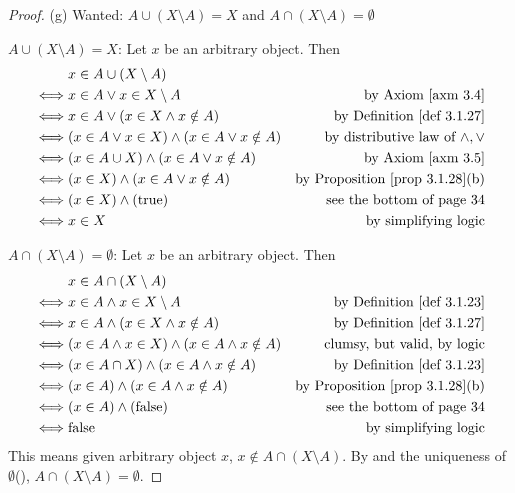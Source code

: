\begin{proof}{(g)} Wanted: \(A \cup (X \setminus A) = X\) and \(A \cap (X \setminus A) = \emptyset\)

\(A \cup (X \setminus A) = X\): Let \(x\) be an arbitrary object. Then
\begin{align*}
         & x \in A \cup (X \setminus A) \\
    \iff & x \in A \lor x \in X \setminus A & \text{by \AXM{3.4}} \\
    \iff & x \in A \lor (x \in X \land x \notin A) & \text{by \DEF{3.1.27}} \\
    \iff & (x \in A \lor x \in X) \land (x \in A \lor x \notin A) & \text{by distributive law of \(\land, \lor\)} \\
    \iff & (x \in A \cup X) \land (x \in A \lor x \notin A) & \text{by \AXM{3.5}} \\
    \iff & (x \in X) \land (x \in A \lor x \notin A) & \text{by \PROP{3.1.28}(b)} \\
    \iff & (x \in X) \land (\text{true}) & \text{see the bottom of page 34} \\
    \iff & x \in X & \text{by simplifying logic}
\end{align*}

\(A \cap (X \setminus A) = \emptyset\): Let \(x\) be an arbitrary object. Then
\begin{align*}
         & x \in A \cap (X \setminus A) \\
    \iff & x \in A \land x \in X \setminus A & \text{by \DEF{3.1.23}} \\
    \iff & x \in A \land (x \in X \land x \notin A) & \text{by \DEF{3.1.27}} \\
    \iff & (x \in A \land x \in X) \land (x \in A \land x \notin A) & \text{clumsy, but valid, by logic} \\
    \iff & (x \in A \cap X) \land (x \in A \land x \notin A) & \text{by \DEF{3.1.23}} \\
    \iff & (x \in A) \land (x \in A \land x \notin A) & \text{by \PROP{3.1.28}(b)} \\
    \iff & (x \in A) \land (\text{false}) & \text{see the bottom of page 34} \\
    \iff & \text{false} & \text{by simplifying logic}
\end{align*}
This means given arbitrary object \(x\), \(x \notin A \cap (X \setminus A)\). By  and the uniqueness of \(\emptyset\)(), \(A \cap (X \setminus A) = \emptyset\).
\end{proof}

